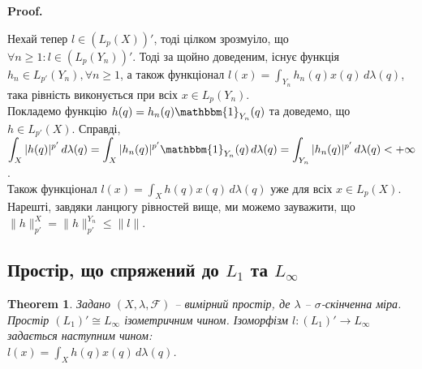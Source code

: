\documentclass[a4paper, 10pt]{article}
\makeatletter
\theoremstyle{theoremdd}
\newtheorem{theorem}{Theorem}[subsection]
\renewenvironment{proof}[1][Proof.\\]{\par
\pushQED{\hfill \qed}%
\normalfont \topsep6\p@\@plus6\p@\relax
\trivlist
\item\relax
{\bfseries
#1\@addpunct{.}}\hspace\labelsep\ignorespaces
}{%
\popQED\endtrivlist\@endpefalse
}
\makeatother
\begin{document}
\begin{proof}
Нехай тепер $l \in (L_p(X))'$, тоді цілком зрозмуіло, що $\forall n \geq 1: l \in (L_p(Y_n))'$. Тоді за щойно доведеним, існує функція $h_n \in L_{p'}(Y_n), \forall n \geq 1$, а також функціонал $l(x) = \displaystyle\int_{Y_n} h_n(q) x(q)\,d\lambda(q)$, така рівність виконується при всіх $x \in L_p(Y_n)$.\\
Покладемо функцію $h(q) = h_n(q) \mathbbm{1}_{Y_n}(q)$ та доведемо, що $h \in L_{p'}(X)$. Справді,\\
$\displaystyle\int_X |h(q)|^{p'}\,d\lambda(q) = \int_X |h_n(q)|^{p'} \mathbbm{1}_{Y_n}(q)\,d\lambda(q) = \int_{Y_n} |h_n(q)|^{p'}\,d\lambda(q) < +\infty$.\\
Також функціонал $l(x) = \displaystyle\int_X h(q)x(q)\,d\lambda(q)$ уже для всіх $x \in L_p(X)$. Нарешті, завдяки ланцюгу рівностей вище, ми можемо зауважити, що $\|h\|_{p'}^{X} = \|h\|_{p'}^{Y_n} \leq \|l\|$.
\end{proof}

\subsection{Простір, що спряжений до $L_1$ та $L_\infty$}
\begin{theorem}
Задано $(X,\lambda,\mathcal{F})$ -- вимірний простір, де $\lambda$ -- $\sigma$-скінченна міра. Простір $(L_1)' \cong L_\infty$ ізометричним чином. Ізоморфізм $l \colon (L_1)' \to L_\infty$ задається наступним чином:\\
$l(x) = \displaystyle\int_X h(q)x(q)\,d\lambda(q)$.
\end{theorem}
\end{document}
